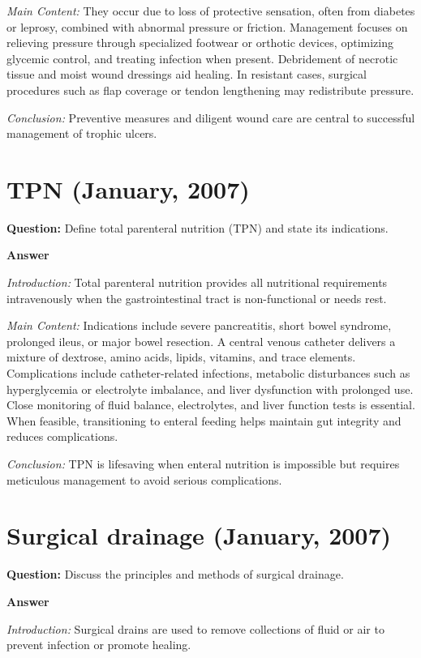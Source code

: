 \documentclass{article}
\begin{document}
\emph{Main Content:} They occur due to loss of protective sensation, often from diabetes or leprosy, combined with abnormal pressure or friction. Management focuses on relieving pressure through specialized footwear or orthotic devices, optimizing glycemic control, and treating infection when present. Debridement of necrotic tissue and moist wound dressings aid healing. In resistant cases, surgical procedures such as flap coverage or tendon lengthening may redistribute pressure.

\emph{Conclusion:} Preventive measures and diligent wound care are central to successful management of trophic ulcers.


\section{TPN (January, 2007)}


\textbf{Question:} Define total parenteral nutrition (TPN) and state its indications.

\textbf{Answer}

\emph{Introduction:} Total parenteral nutrition provides all nutritional requirements intravenously when the gastrointestinal tract is non-functional or needs rest.

\emph{Main Content:} Indications include severe pancreatitis, short bowel syndrome, prolonged ileus, or major bowel resection. A central venous catheter delivers a mixture of dextrose, amino acids, lipids, vitamins, and trace elements. Complications include catheter-related infections, metabolic disturbances such as hyperglycemia or electrolyte imbalance, and liver dysfunction with prolonged use. Close monitoring of fluid balance, electrolytes, and liver function tests is essential. When feasible, transitioning to enteral feeding helps maintain gut integrity and reduces complications.

\emph{Conclusion:} TPN is lifesaving when enteral nutrition is impossible but requires meticulous management to avoid serious complications.


\section{Surgical drainage (January, 2007)}


\textbf{Question:} Discuss the principles and methods of surgical drainage.

\textbf{Answer}

\emph{Introduction:} Surgical drains are used to remove collections of fluid or air to prevent infection or promote healing.
\end{document}
